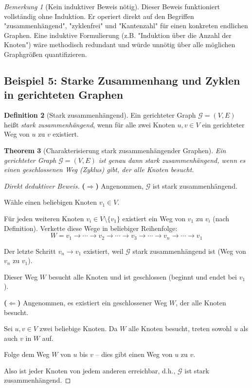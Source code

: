 \documentclass[12pt, a4paper]{article}
\newtheorem{theorem}{Theorem}[section]
\theoremstyle{definition}
\newtheorem{definition}[theorem]{Definition}
\theoremstyle{remark}
\newtheorem{remark}[theorem]{Bemerkung}
\newcommand{\Graph}{\mathcal{G}}
\begin{document}
\begin{remark}[Kein induktiver Beweis nötig]
\label{rem:baum_keine_induktion}
Dieser Beweis funktioniert vollständig ohne Induktion. Er operiert direkt auf den Begriffen "zusammenhängend", "zyklenfrei" und "Kantenzahl" für einen konkreten endlichen Graphen. Eine induktive Formulierung (z.B. "Induktion über die Anzahl der Knoten") wäre methodisch redundant und würde unnötig über alle möglichen Graphgrößen quantifizieren.
\end{remark}

\subsection{Beispiel 5: Starke Zusammenhang und Zyklen in gerichteten Graphen}
\label{subsec:beispiel_stark_zusammenhang}

\begin{definition}[Stark zusammenhängend]
\label{def:stark_zusammenhaengend}
Ein gerichteter Graph $\Graph = (V, E)$ heißt \emph{stark zusammenhängend}, wenn für alle zwei Knoten $u, v \in V$ ein gerichteter Weg von $u$ zu $v$ existiert.
\end{definition}

\begin{theorem}[Charakterisierung stark zusammenhängender Graphen]
\label{thm:scc_charakterisierung}
Ein gerichteter Graph $\Graph = (V, E)$ ist genau dann stark zusammenhängend, wenn es einen geschlossenen Weg (Zyklus) gibt, der alle Knoten besucht.
\end{theorem}

\begin{proof}[Direkt deduktiver Beweis]
\textbf{($\Rightarrow$)} Angenommen, $\Graph$ ist stark zusammenhängend.

Wähle einen beliebigen Knoten $v_1 \in V$. 

Für jeden weiteren Knoten $v_i \in V \setminus \{v_1\}$ existiert ein Weg von $v_1$ zu $v_i$ (nach Definition). Verkette diese Wege in beliebiger Reihenfolge:
\[
  W = v_1 \to \cdots \to v_2 \to \cdots \to v_3 \to \cdots \to v_n \to \cdots \to v_1
\]

Der letzte Schritt $v_n \to v_1$ existiert, weil $\Graph$ stark zusammenhängend ist (Weg von $v_n$ zu $v_1$).

Dieser Weg $W$ besucht alle Knoten und ist geschlossen (beginnt und endet bei $v_1$).

\textbf{($\Leftarrow$)} Angenommen, es existiert ein geschlossener Weg $W$, der alle Knoten besucht.

Sei $u, v \in V$ zwei beliebige Knoten. Da $W$ alle Knoten besucht, treten sowohl $u$ als auch $v$ in $W$ auf.

Folge dem Weg $W$ von $u$ bis $v$ -- dies gibt einen Weg von $u$ zu $v$.

Also ist jeder Knoten von jedem anderen erreichbar, d.h., $\Graph$ ist stark zusammenhängend.
\end{proof}
\end{document}
